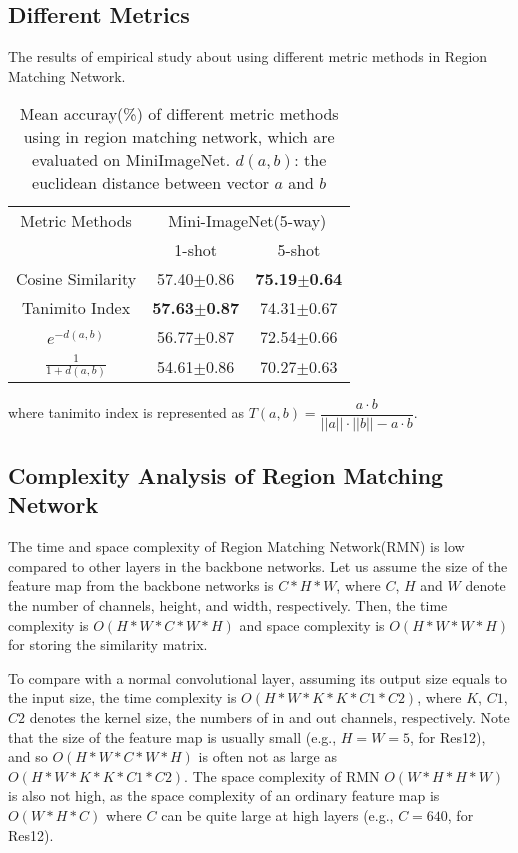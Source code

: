 \documentclass[letterpaper]{article}
\begin{document}
\subsection{Different Metrics}
The results of empirical study about using different metric methods in Region Matching Network. 

\begin{table}[H]
    \caption{Mean accuray(\%) of different metric methods using in region matching network, which are evaluated on MiniImageNet. $d(a,b)$: the euclidean distance between vector $a$ and $b$}
    \label{table: different metrics}
    \centering
    \begin{tabular}{c c c}
         \hline
         Metric Methods&\multicolumn{2}{c}{Mini-ImageNet(5-way)}  \\
         &1-shot&5-shot \\ \hline
         Cosine Similarity&57.40$\pm$0.86&\textbf{75.19$\pm$0.64} \\
         \hline
         Tanimito Index&\textbf{57.63$\pm$0.87}&74.31$\pm$0.67 \\
         \hline
         $e^{-d(a,b)}$&56.77$\pm$0.87&72.54$\pm$0.66 \\
         \hline
         $\frac{1}{1+d(a,b)}$&54.61$\pm$0.86&70.27$\pm$0.63 \\
         \hline
    \end{tabular}
 
\end{table}

where tanimito index is represented as $T(a,b)=\dfrac{a\cdot b}{||a||\cdot ||b||-a\cdot b}$.

\subsection{Complexity Analysis of Region Matching Network}
The time and space complexity of Region Matching Network(RMN) is low compared to other layers in the backbone networks. Let us assume the size of the feature map from the backbone networks is $C*H*W$, where $C$, $H$ and $W$ denote the number of channels, height, and width, respectively. Then, the time complexity is $O(H*W*C*W*H)$ and space complexity is $O(H*W*W*H)$ for storing the similarity matrix.

To compare with a normal convolutional layer, assuming its output size equals to the input size, the time complexity is $O(H*W*K*K*C1*C2)$, where $K$, $C1$, $C2$ denotes the kernel size, the numbers of in and out channels, respectively. Note that the size of the feature map is usually small (e.g., $H=W=5$, for Res12), and so $O(H*W*C*W*H)$ is often not as large as $O(H*W*K*K*C1*C2)$. The space complexity of RMN $O(W*H*H*W)$ is also not high, as the space complexity of an ordinary feature map is $O(W*H*C)$ where $C$ can be quite large at high layers (e.g., $C=640$, for Res12).
\end{document}
